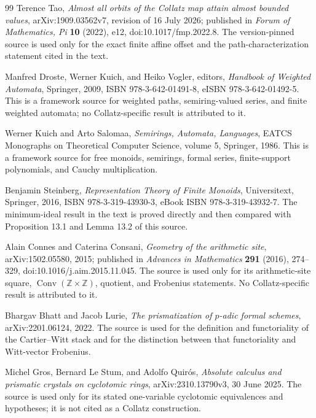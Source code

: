 \begin{thebibliography}{99}
Terence Tao,
\emph{Almost all orbits of the Collatz map attain almost bounded values},
arXiv:1909.03562v7, revision of 16 July 2026; published in
\emph{Forum of Mathematics, Pi} \textbf{10} (2022), e12,
doi:10.1017/fmp.2022.8.
The version-pinned source is used only for the exact finite affine offset and
the path-characterization statement cited in the text.

Manfred Droste, Werner Kuich, and Heiko Vogler, editors,
\emph{Handbook of Weighted Automata}, Springer, 2009,
ISBN 978-3-642-01491-8, eISBN 978-3-642-01492-5.
This is a framework source for weighted paths, semiring-valued series, and
finite weighted automata; no Collatz-specific result is attributed to it.

Werner Kuich and Arto Salomaa,
\emph{Semirings, Automata, Languages}, EATCS Monographs on Theoretical
Computer Science, volume 5, Springer, 1986.
This is a framework source for free monoids, semirings, formal series,
finite-support polynomials, and Cauchy multiplication.

Benjamin Steinberg,
\emph{Representation Theory of Finite Monoids}, Universitext, Springer,
2016, ISBN 978-3-319-43930-3, eBook ISBN 978-3-319-43932-7.
The minimum-ideal result in the text is proved directly and then compared
with Proposition 13.1 and Lemma 13.2 of this source.

Alain Connes and Caterina Consani,
\emph{Geometry of the arithmetic site},
arXiv:1502.05580, 2015; published in
\emph{Advances in Mathematics} \textbf{291} (2016), 274--329,
doi:10.1016/j.aim.2015.11.045.
The source is used only for its arithmetic-site square,
$\operatorname{Conv}(\mathbb Z\times\mathbb Z)$, quotient, and Frobenius
statements.  No Collatz-specific result is attributed to it.

Bhargav Bhatt and Jacob Lurie,
\emph{The prismatization of $p$-adic formal schemes},
arXiv:2201.06124, 2022.
The source is used for the definition and functoriality of the Cartier--Witt
stack and for the distinction between that functoriality and Witt-vector
Frobenius.

Michel Gros, Bernard Le Stum, and Adolfo Quir\'os,
\emph{Absolute calculus and prismatic crystals on cyclotomic rings},
arXiv:2310.13790v3, 30 June 2025.
The source is used only for its stated one-variable cyclotomic equivalences
and hypotheses; it is not cited as a Collatz construction.


\end{thebibliography}
